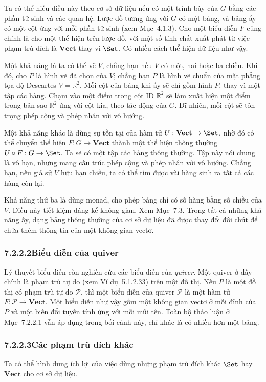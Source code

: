 Ta có thể hiểu điều này theo cơ sở dữ liệu nếu có một trình bày của $G$ bằng các phần tử sinh và các quan hệ. Lược đồ tương ứng với $G$ có một bảng, và bảng ấy có một cột ứng với mỗi phần tử sinh (xem Mục~4.1.3). Cho một biểu diễn $F$ cũng chính là cho một thể hiện trên lược đồ, với một số tính chất xuất phát từ việc phạm trù đích là $\mathbf{Vect}$ thay vì $\Set$. Có nhiều cách thể hiện dữ liệu như vậy.

Một khả năng là ta có thể vẽ $V$, chẳng hạn nếu $V$ có một, hai hoặc ba chiều. Khi đó, cho $P$ là hình vẽ đã chọn của $V$; chẳng hạn $P$ là hình vẽ chuẩn của mặt phẳng tọa độ Descartes $V=\mathbb R^2$. Mỗi cột của bảng khi ấy sẽ chỉ gồm hình $P$, thay vì một tập các hàng. Chạm vào một điểm trong cột ID $\mathbb R^2$ sẽ làm xuất hiện một điểm trong bản sao $\mathbb R^2$ ứng với cột kia, theo tác động của $G$. Dĩ nhiên, mỗi cột sẽ tôn trọng phép cộng và phép nhân với vô hướng.

Một khả năng khác là dùng sự tồn tại của hàm tử $U:\mathbf{Vect}\to\Set$, nhờ đó có thể chuyển thể hiện $F:G\to\mathbf{Vect}$ thành một thể hiện thông thường $U\circ F:G\to\Set$.
Ta sẽ có một tập các hàng thông thường. Tập này nói chung là vô hạn, nhưng mang cấu trúc phép cộng và phép nhân với vô hướng. Chẳng hạn, nếu giả sử $V$ hữu hạn chiều, ta có thể tìm được vài hàng sinh ra tất cả các hàng còn lại.

Khả năng thứ ba là dùng monad, cho phép bảng chỉ có số hàng bằng số chiều của $V$. Điều này tiết kiệm đáng kể không gian. Xem Mục~7.3. Trong tất cả những khả năng ấy, dạng bảng thông thường của cơ sở dữ liệu đã được thay đổi đôi chút để chứa thêm thông tin của một không gian vectơ.

\subsubsection*{7.2.2.2\quad Biểu diễn của quiver}
Lý thuyết biểu diễn còn nghiên cứu các biểu diễn của \emph{quiver}. Một quiver ở đây chính là phạm trù tự do (xem Ví dụ~5.1.2.33) trên một đồ thị. Nếu $P$ là một đồ thị có phạm trù tự do $\mathcal P$, thì một biểu diễn của quiver $\mathcal P$ là một hàm tử $F:\mathcal P\to\mathbf{Vect}$. Một biểu diễn như vậy gồm một không gian vectơ ở mỗi đỉnh của $P$ và một biến đổi tuyến tính ứng với mỗi mũi tên. Toàn bộ thảo luận ở Mục~7.2.2.1 vẫn áp dụng trong bối cảnh này, chỉ khác là có nhiều hơn một bảng.

\subsubsection*{7.2.2.3\quad Các phạm trù đích khác}
Ta có thể hình dung ích lợi của việc dùng những phạm trù đích khác $\Set$ hay $\mathbf{Vect}$ cho cơ sở dữ liệu.

